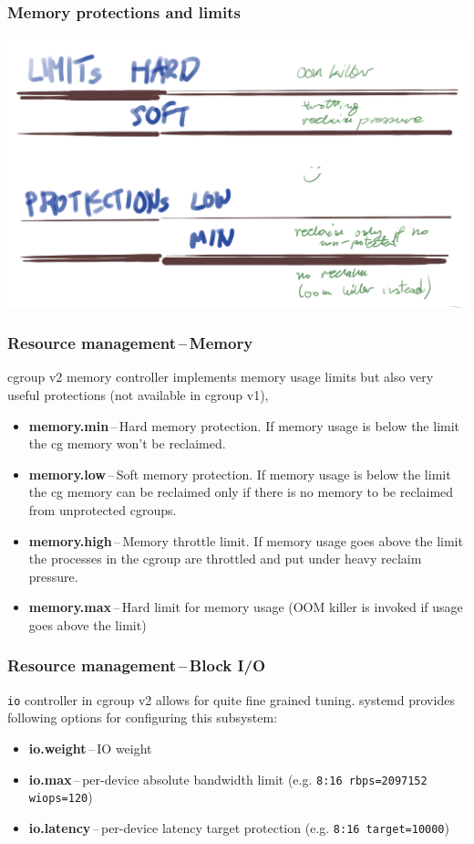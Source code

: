 \documentclass[serif]{beamer}
\begin{document}
\begin{frame}
  \frametitle{Memory protections and limits}

  \begin{adjustwidth}{-2em}{-2em}
    \includegraphics[width=\paperwidth]{images/memory-protection.png}
  \end{adjustwidth}
\end{frame}

\begin{frame}
  \frametitle{Resource management\,--\,Memory}
  cgroup v2 memory controller implements memory usage limits but also very useful protections (not available in cgroup v1),

  \begin{itemize}
  \item \textbf{memory.min}\,--\,Hard memory protection. If memory usage is below the limit the cg memory won't be reclaimed.

  \item \textbf{memory.low}\,--\,Soft memory protection. If memory usage is below the limit the cg memory can be reclaimed only if there is no memory to be reclaimed from unprotected cgroups.

  \item \textbf{memory.high}\,--\,Memory throttle limit. If memory usage goes above the limit the processes in the cgroup are throttled and put under heavy reclaim pressure.

  \item \textbf{memory.max}\,--\,Hard limit for memory usage (OOM killer is invoked if usage goes above the limit)
  \end{itemize}
\end{frame}

\begin{frame}
  \frametitle{Resource management\,--\,Block I/O}
  \texttt{io} controller in cgroup v2 allows for quite fine grained tuning.
  systemd provides following options for configuring this subsystem:
  \begin{itemize}
  \item \textbf{io.weight}\,--\,IO weight
  \item \textbf{io.max}\,--\,per-device absolute bandwidth limit (e.g. \texttt{8:16 rbps=2097152 wiops=120})
  \item \textbf{io.latency}\,--\,per-device latency target protection (e.g. \texttt{8:16 target=10000})
  \end{itemize}
\end{frame}
\end{document}
